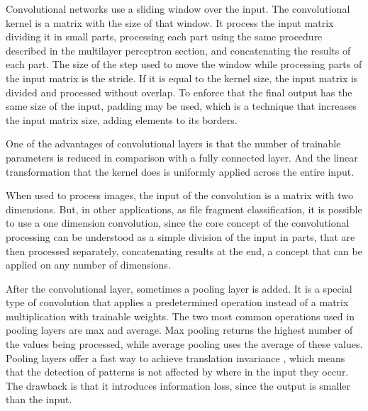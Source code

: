 Convolutional networks \cite{lecun_backpropagation_1989} \cite{lecun_convolutional_1995} use a sliding window over the input. The convolutional kernel is a matrix with the size of that window. It process the input matrix dividing it in small parts, processing each part using the same procedure described in the multilayer perceptron section, and concatenating the results of each part. The size of the step used to move the window while processing parts of the input matrix is the stride. If it is equal to the kernel size, the input matrix is divided and processed without overlap. To enforce that the final output has the same size of the input, padding may be used, which is a technique that increases the input matrix size, adding elements to its borders.

One of the advantages of convolutional layers is that the number of trainable parameters is reduced in comparison with a fully connected layer. And the linear transformation that the kernel does is uniformly applied across the entire input.

When used to process images, the input of the convolution is a matrix with two dimensions. But, in other applications, as file fragment classification, it is possible to use a one dimension convolution, since the core concept of the convolutional processing can be understood as a simple division of the input in parts, that are then processed separately, concatenating results at the end, a concept that can be applied on any number of dimensions.

After the convolutional layer, sometimes a pooling layer is added. It is a special type of convolution that applies a predetermined operation instead of a matrix multiplication with trainable weights. The two most common operations used in pooling layers are max and average. Max pooling returns the highest number of the values being processed, while average pooling uses the average of these values. Pooling layers offer a fast way to achieve translation invariance \cite{hinton_learning_1987}, which means that the detection of patterns is not affected by where in the input they occur. The drawback is that it introduces information loss, since the output is smaller than the input.